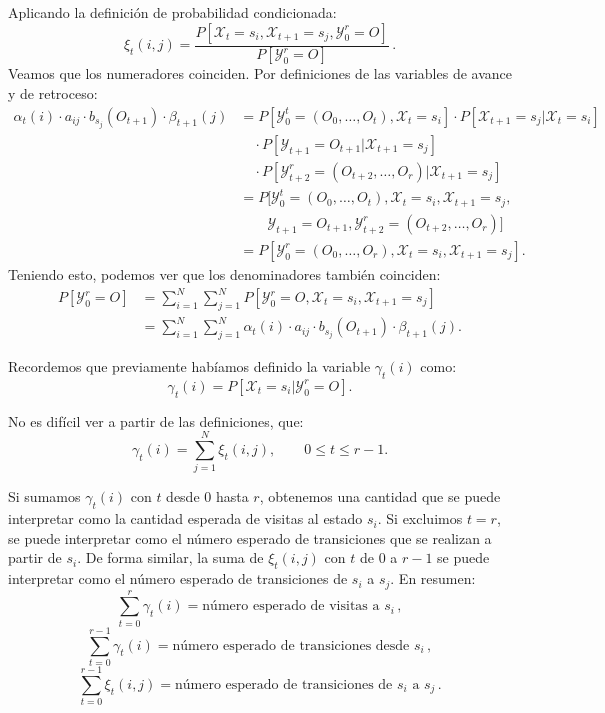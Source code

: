 \begin{proofs*}
Aplicando la definición de probabilidad condicionada:
\[\xi_t(i,j)=\frac{P[\mathcal{X}_t=s_i,\mathcal{X}_{t+1}=s_j,\mathcal{Y}_0^r=O]}{P[\mathcal{Y}_0^r=O]}\,.\]
Veamos que los numeradores coinciden. Por definiciones de las variables de avance y de retroceso:
\[
\begin{aligned}
    \alpha_t(i)\cdot a_{ij}\cdot b_{s_j}(O_{t+1})\cdot\beta_{t+1}(j)&=P[\mathcal{Y}_0^t=(O_0,\dots,O_t),\mathcal{X}_t=s_i]\cdot P[\mathcal{X}_{t+1}=s_j|\mathcal{X}_t=s_i]\\
    &\quad\cdot P[\mathcal{Y}_{t+1}=O_{t+1}|\mathcal{X}_{t+1}=s_j]\\
    &\quad\cdot P[\mathcal{Y}_{t+2}^r=(O_{t+2},\dots,O_r)|\mathcal{X}_{t+1}=s_j]\\
    &=P[\mathcal{Y}_0^t=(O_0,\dots,O_t),\mathcal{X}_t=s_i,\mathcal{X}_{t+1}=s_j,\\
    &\qquad\mathcal{Y}_{t+1}=O_{t+1},\mathcal{Y}_{t+2}^r=(O_{t+2},\dots,O_r)]\\
    &=P[\mathcal{Y}_0^r=(O_0,\dots,O_r),\mathcal{X}_t=s_i,\mathcal{X}_{t+1}=s_j].
\end{aligned}
\]
Teniendo esto, podemos ver que los denominadores también coinciden:
\begin{align*}
    P[\mathcal{Y}_{0}^r=O]&= \sum_{i=1}^N\sum_{j=1}^N P[\mathcal{Y}_0^r=O,\mathcal{X}_t=s_i,\mathcal{X}_{t+1}=s_j]\\
    &=\sum_{i=1}^N\sum_{j=1}^N\alpha_t(i)\cdot a_{ij}\cdot b_{s_j}(O_{t+1})\cdot\beta_{t+1}(j). \tag*{\qedsymbol}
\end{align*}

\end{proofs*}

Recordemos que previamente habíamos definido la variable $\gamma_t(i)$ como:
\[\gamma_t(i)=P[\mathcal{X}_t=s_i|\mathcal{Y}_0^r=O].\]

No es difícil ver a partir de las definiciones, que:
\[\gamma_t(i)=\sum_{j=1}^N\xi_t(i,j), \qquad 0\leq t\leq r-1.\]

Si sumamos $\gamma_t(i)$ con $t$ desde $0$ hasta $r$, obtenemos una cantidad que se puede interpretar como la cantidad esperada de visitas al estado $s_i$. Si excluimos $t=r$, se puede interpretar como el número esperado de transiciones que se realizan a partir de $s_i$. De forma similar, la suma de $\xi_t(i,j)$ con $t$ de $0$ a $r-1$ se puede interpretar como el número esperado de transiciones de $s_i$ a $s_j$. En resumen:
\[\sum_{t=0}^{r}\gamma_t(i)=\text{número esperado de visitas a $s_i$}\,,\]
\[\sum_{t=0}^{r-1}\gamma_t(i)=\text{número esperado de transiciones desde } s_i \, ,\]
\[\sum_{t=0}^{r-1}\xi_t(i,j)=\text{número esperado de transiciones de } s_i \text{ a } s_j\, .\]

